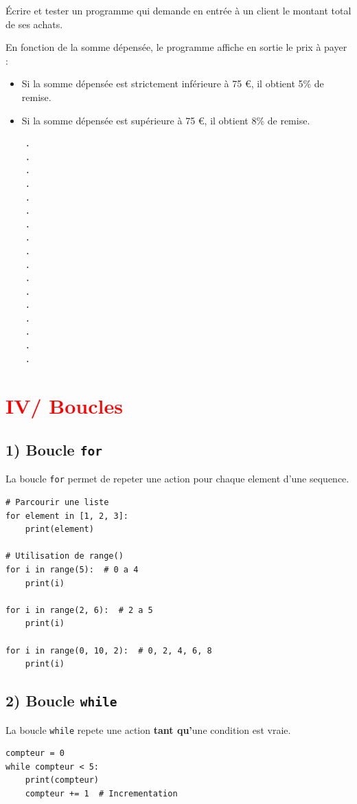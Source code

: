 \documentclass[12pt]{article}
\begin{document}
\begin{mdframed}[
    linewidth=1pt,
    roundcorner=5pt,
    linecolor=RoyalBlue,
    innertopmargin=10pt,
    innerbottommargin=10pt
]
\vspace{5pt}
Écrire et tester un programme qui demande en entrée à un client le montant total de
ses achats.

\vspace{5pt}
En fonction de la somme dépensée, le programme affiche en sortie le prix à payer :
\begin{itemize}
    \item Si la somme dépensée est strictement inférieure à 75 €, il obtient 5\% de remise.
    \item Si la somme dépensée est supérieure à 75 €, il obtient 8\% de remise.
\end{itemize}

\begin{lstlisting}
    .
    .
    .
    .
    .
    .
    .
    .
    .
    .
    .
    .
    .
    .
    .
    .
    .

\end{lstlisting}

\end{mdframed}

\vspace{10pt}
\section*{\textcolor{red}{IV/ Boucles}}
\subsection*{1) Boucle \texttt{for}}
La boucle \texttt{for} permet de repeter une action pour chaque element d'une sequence.
\begin{lstlisting}[caption={Exemples avec \texttt{for}}]
# Parcourir une liste
for element in [1, 2, 3]:
    print(element)

# Utilisation de range()
for i in range(5):  # 0 a 4
    print(i)

for i in range(2, 6):  # 2 a 5
    print(i)

for i in range(0, 10, 2):  # 0, 2, 4, 6, 8
    print(i)
\end{lstlisting}

\subsection*{2) Boucle \texttt{while}}
La boucle \texttt{while} repete une action \textbf{tant qu'}une condition est vraie.
\begin{lstlisting}[caption={Exemple avec \texttt{while}}]
compteur = 0
while compteur < 5:
    print(compteur)
    compteur += 1  # Incrementation
\end{lstlisting}
\end{document}
